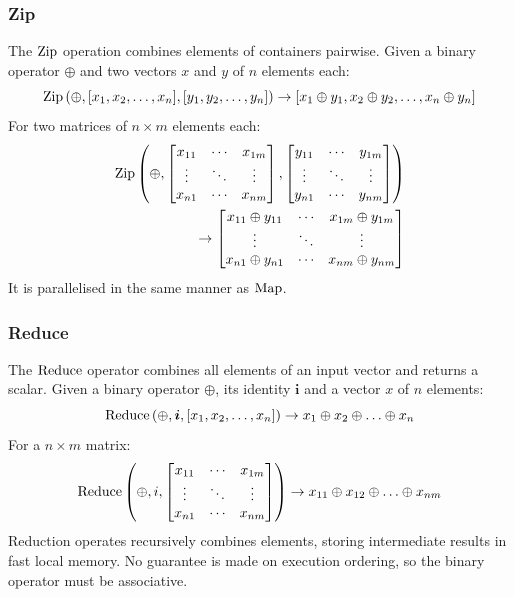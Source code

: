 \subsubsection{Zip}

The $\operatorname*{Zip}$ operation combines elements of containers pairwise. Given a
binary operator $\oplus$ and two vectors $x$ and $y$ of $n$ elements
each:
%
\begin{equation}
\operatorname*{Zip}\left( \oplus, [x_1,x_2,\ldots,x_n], [y_1,y_2,\ldots,y_n] \right)
\to
\left[ x_1 \oplus y_1, x_2 \oplus y_2, \ldots, x_n \oplus y_n \right]
\end{equation}
%
For two matrices of $n \times m$ elements each:
%
\begin{equation}
\begin{split}
\operatorname*{Zip} \left( \oplus,
\begin{bmatrix}
  x_{11} & \cdots & x_{1m} \\
  \vdots & \ddots & \vdots \\
  x_{n1} & \cdots & x_{nm}
\end{bmatrix},
\begin{bmatrix}
  y_{11} & \cdots & y_{1m} \\
  \vdots & \ddots & \vdots \\
  y_{n1} & \cdots & y_{nm}
\end{bmatrix} \right) \\
\to
\begin{bmatrix}
  x_{11} \oplus y_{11} & \cdots & x_{1m} \oplus y_{1m} \\
  \vdots & \ddots & \vdots \\
  x_{n1} \oplus y_{n1} & \cdots & x_{nm} \oplus y_{nm}
\end{bmatrix}
\end{split}
\end{equation}
%
It is parallelised in the same manner as $\operatorname*{Map}$.


\subsubsection{Reduce}

The $\operatorname*{Reduce}$ operator combines all elements of an input vector and
returns a scalar. Given a binary operator $\oplus$, its identity
$\bm{i}$ and a vector $x$ of $n$ elements:
%
\begin{equation}
  \operatorname*{Reduce} \left( \oplus, \bm{i}, [x_1,x_2,\ldots,x_n] \right)
  \to
  x_1 \oplus x_2 \oplus \ldots \oplus x_n
\end{equation}
%
For a $n \times m$ matrix:
%
\begin{equation}
\operatorname*{Reduce} \left( \oplus, i,
\begin{bmatrix}
  x_{11} & \cdots & x_{1m} \\
  \vdots & \ddots & \vdots \\
  x_{n1} & \cdots & x_{nm}
\end{bmatrix} \right)
\to
x_{11} \oplus x_{12} \oplus \ldots \oplus x_{nm}
\end{equation}
%
Reduction operates recursively combines elements, storing intermediate
results in fast local memory. No guarantee is made on execution
ordering, so the binary operator must be associative.


